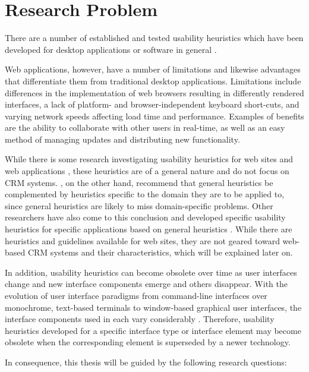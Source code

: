 \section{Research Problem}
There are a number of established and tested usability heuristics which have been developed for desktop applications or software in general \citep[e.g.][see section \ref{sec:heuristics_review}]{Molich1990,Nielsen1994a,Pierotti1995,Leavitt2006}.

Web applications, however, have a number of limitations and likewise advantages that differentiate them from traditional desktop applications. Limitations include differences in the implementation of web browsers resulting in differently rendered interfaces, a lack of platform- and browser-independent keyboard short-cuts, and varying network speeds affecting load time and performance. Examples of benefits are the ability to collaborate with other users in real-time, as well as an easy method of managing updates and distributing new functionality. %

While there is some research investigating usability heuristics for web sites and web applications \citep[e.g.][]{DeJong2000,Krug2006,Leavitt2006,Najjar2011}, these heuristics are of a general nature and do not focus on CRM systems. , on the other hand, recommend that general heuristics be complemented by heuristics specific to the domain they are to be applied to, since general heuristics are likely to miss domain-specific problems. Other researchers have also come to this conclusion and developed specific usability heuristics for specific applications based on general heuristics \citep[e.g.][]{Zhang2011}. While there are heuristics and guidelines available for web sites, they are not geared toward web-based CRM systems and their characteristics, which will be explained later on.

In addition, usability heuristics can become obsolete over time as user interfaces change and new interface components emerge and others disappear. With the evolution of user interface paradigms from command-line interfaces over monochrome, text-based terminals to window-based graphical user interfaces, the interface components used in each vary considerably \citep[p.\ 220ff]{Sharp2007}. Therefore, usability heuristics developed for a specific interface type or interface element may become obsolete when the corresponding element is superseded by a newer technology.

In consequence, this thesis will be guided by the following research questions:

